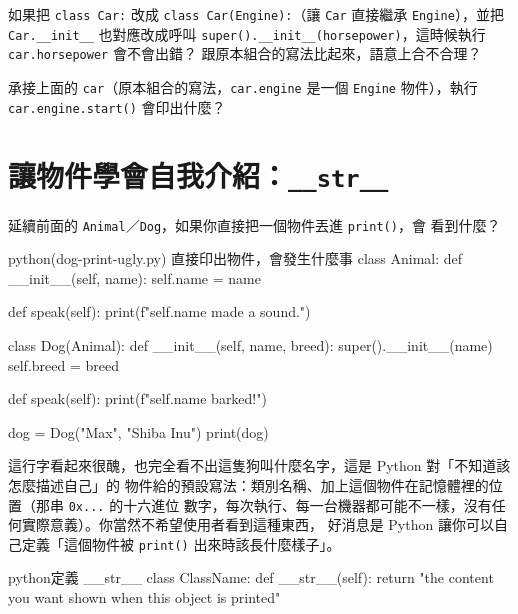\begin{drills}[label=drills:inheritance-vs-composition]
\item 如果把 \texttt{class Car:} 改成 \texttt{class Car(Engine):}（讓 \texttt{Car} 直接繼承
\texttt{Engine}），並把 \texttt{Car.\_\_init\_\_} 也對應改成呼叫
\texttt{super().\_\_init\_\_(horsepower)}，這時候執行 \texttt{car.horsepower} 會不會出錯？
跟原本組合的寫法比起來，語意上合不合理？
\item 承接上面的 \texttt{car}（原本組合的寫法，\texttt{car.engine} 是一個 \texttt{Engine}
物件），執行 \texttt{car.engine.start()} 會印出什麼？
\end{drills}

\section{讓物件學會自我介紹：\texttt{\_\_str\_\_}}
\label{sec:str-method}

延續前面的 \texttt{Animal}／\texttt{Dog}，如果你直接把一個物件丟進 \texttt{print()}，會
看到什麼？

\begin{example}{python}{(dog-print-ugly.py) 直接印出物件，會發生什麼事}
class Animal:
    def __init__(self, name):
        self.name = name

    def speak(self):
        print(f"{self.name} made a sound.")


class Dog(Animal):
    def __init__(self, name, breed):
        super().__init__(name)
        self.breed = breed

    def speak(self):
        print(f"{self.name} barked!")


dog = Dog("Max", "Shiba Inu")
print(dog)
\end{example}


這行字看起來很醜，也完全看不出這隻狗叫什麼名字，這是 Python 對「不知道該怎麼描述自己」的
物件給的預設寫法：類別名稱、加上這個物件在記憶體裡的位置（那串 \texttt{0x...} 的十六進位
數字，每次執行、每一台機器都可能不一樣，沒有任何實際意義）。你當然不希望使用者看到這種東西，
好消息是 Python 讓你可以自己定義「這個物件被 \texttt{print()} 出來時該長什麼樣子」。

\begin{code}{python}{定義 \_\_str\_\_}
class ClassName:
    def __str__(self):
        return "the content you want shown when this object is printed"
\end{code}


